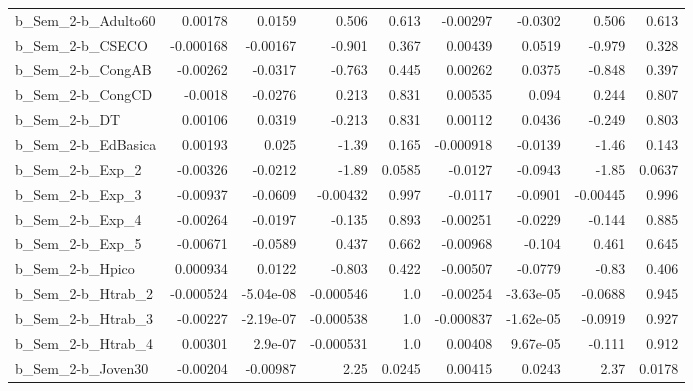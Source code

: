\begin{tabular}{lrrrrrrrr}
b\_Sem\_2-b\_Adulto60         &     0.00178 &       0.0159 &     0.506 &    0.613 &   -0.00297 &     -0.0302 &        0.506 &         0.613 \\
b\_Sem\_2-b\_CSECO            &   -0.000168 &     -0.00167 &    -0.901 &    0.367 &    0.00439 &      0.0519 &       -0.979 &         0.328 \\
b\_Sem\_2-b\_CongAB           &    -0.00262 &      -0.0317 &    -0.763 &    0.445 &    0.00262 &      0.0375 &       -0.848 &         0.397 \\
b\_Sem\_2-b\_CongCD           &     -0.0018 &      -0.0276 &     0.213 &    0.831 &    0.00535 &       0.094 &        0.244 &         0.807 \\
b\_Sem\_2-b\_DT               &     0.00106 &       0.0319 &    -0.213 &    0.831 &    0.00112 &      0.0436 &       -0.249 &         0.803 \\
b\_Sem\_2-b\_EdBasica         &     0.00193 &        0.025 &     -1.39 &    0.165 &  -0.000918 &     -0.0139 &        -1.46 &         0.143 \\
b\_Sem\_2-b\_Exp\_2            &    -0.00326 &      -0.0212 &     -1.89 &   0.0585 &    -0.0127 &     -0.0943 &        -1.85 &        0.0637 \\
b\_Sem\_2-b\_Exp\_3            &    -0.00937 &      -0.0609 &  -0.00432 &    0.997 &    -0.0117 &     -0.0901 &     -0.00445 &         0.996 \\
b\_Sem\_2-b\_Exp\_4            &    -0.00264 &      -0.0197 &    -0.135 &    0.893 &   -0.00251 &     -0.0229 &       -0.144 &         0.885 \\
b\_Sem\_2-b\_Exp\_5            &    -0.00671 &      -0.0589 &     0.437 &    0.662 &   -0.00968 &      -0.104 &        0.461 &         0.645 \\
b\_Sem\_2-b\_Hpico            &    0.000934 &       0.0122 &    -0.803 &    0.422 &   -0.00507 &     -0.0779 &        -0.83 &         0.406 \\
b\_Sem\_2-b\_Htrab\_2          &   -0.000524 &    -5.04e-08 & -0.000546 &      1.0 &   -0.00254 &   -3.63e-05 &      -0.0688 &         0.945 \\
b\_Sem\_2-b\_Htrab\_3          &    -0.00227 &    -2.19e-07 & -0.000538 &      1.0 &  -0.000837 &   -1.62e-05 &      -0.0919 &         0.927 \\
b\_Sem\_2-b\_Htrab\_4          &     0.00301 &      2.9e-07 & -0.000531 &      1.0 &    0.00408 &    9.67e-05 &       -0.111 &         0.912 \\
b\_Sem\_2-b\_Joven30          &    -0.00204 &     -0.00987 &      2.25 &   0.0245 &    0.00415 &      0.0243 &         2.37 &        0.0178 \\

\end{tabular}
